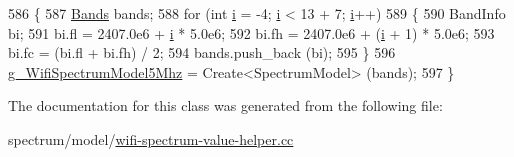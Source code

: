 \begin{DoxyCode}
586   \{
587     \hyperlink{namespacens3_a46ac9188e5cf43bd5292f7b67451246e}{Bands} bands;
588     \textcolor{keywordflow}{for} (\textcolor{keywordtype}{int} \hyperlink{bernuolliDistribution_8m_a6f6ccfcf58b31cb6412107d9d5281426}{i} = -4; \hyperlink{bernuolliDistribution_8m_a6f6ccfcf58b31cb6412107d9d5281426}{i} < 13 + 7; \hyperlink{bernuolliDistribution_8m_a6f6ccfcf58b31cb6412107d9d5281426}{i}++)
589       \{
590         BandInfo bi;
591         bi.fl = 2407.0e6 + \hyperlink{bernuolliDistribution_8m_a6f6ccfcf58b31cb6412107d9d5281426}{i} * 5.0e6;
592         bi.fh = 2407.0e6 + (\hyperlink{bernuolliDistribution_8m_a6f6ccfcf58b31cb6412107d9d5281426}{i} + 1) * 5.0e6;
593         bi.fc = (bi.fl +  bi.fh) / 2;
594         bands.push\_back (bi);
595       \}
596     \hyperlink{namespacens3_a333f39e20bd1e6b083d03c143b0be161}{g\_WifiSpectrumModel5Mhz} = Create<SpectrumModel> (bands);
597   \}
\end{DoxyCode}


The documentation for this class was generated from the following file\+:\begin{DoxyCompactItemize}
\item 
spectrum/model/\hyperlink{wifi-spectrum-value-helper_8cc}{wifi-\/spectrum-\/value-\/helper.\+cc}\end{DoxyCompactItemize}
